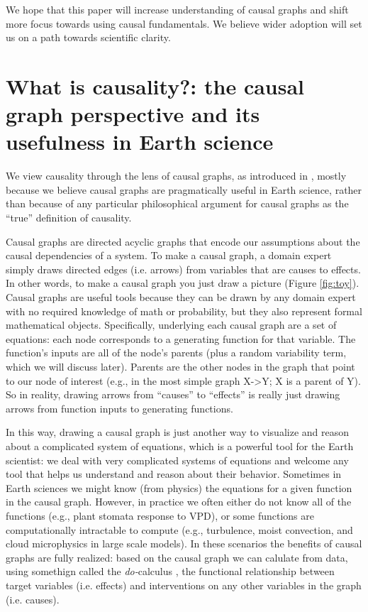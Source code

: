 \documentclass[12pt]{article}
\begin{document}
We hope that this paper will increase understanding of causal graphs
and shift more focus towards using causal fundamentals. We believe
wider adoption will set us on a path towards scientific clarity.

\section{What is causality?: the causal graph perspective and its
  usefulness in Earth science}

We view causality through the lens of causal graphs, as introduced in
\citet{pearl1995causal}, mostly because we believe causal graphs are
pragmatically useful in Earth science, rather than because of any
particular philosophical argument for causal graphs as the ``true''
definition of causality.

Causal graphs are directed acyclic graphs that encode our assumptions
about the causal dependencies of a system.  To make a causal graph, a
domain expert simply draws directed edges (i.e. arrows) from variables
that are causes to effects. In other words, to make a causal graph you
just draw a picture (Figure \ref{fig:toy}). Causal graphs are useful
tools because they can be drawn by any domain expert with no required
knowledge of math or probability, but they also represent formal
mathematical objects. Specifically, underlying each causal graph are a
set of equations: each node corresponds to a generating function for
that variable. The function's inputs are all of the node's parents
(plus a random variability term, which we will discuss later). Parents
are the other nodes in the graph that point to our node of interest
(e.g., in the most simple graph X->Y; X is a parent of Y). So in
reality, drawing arrows from ``causes'' to ``effects'' is really just
drawing arrows from function inputs to generating functions.

In this way, drawing a causal graph is just another way to visualize
and reason about a complicated system of equations, which is a
powerful tool for the Earth scientist: we deal with very complicated
systems of equations and welcome any tool that helps us understand and
reason about their behavior. Sometimes in Earth sciences we might know
(from physics) the equations for a given function in the causal
graph. However, in practice we often either do not know all of the
functions (e.g., plant stomata response to VPD), or some functions are
computationally intractable to compute (e.g., turbulence, moist
convection, and cloud microphysics in large scale models). In these
scenarios the benefits of causal graphs are fully realized: based on
the causal graph we can calulate from data, using somethign called the
\textit{do-}calculus \citep{pearl-1994-do-calculus}, the functional
relationship between target variables (i.e. effects) and interventions
on any other variables in the graph (i.e. causes).
\end{document}
